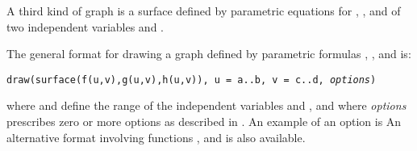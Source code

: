 
A third kind of \threedim{} graph is a surface defined by
parametric equations for , , and
 of two independent variables  and .

%
\beginImportant
The general format for drawing a \threedim{} graph defined by
parametric formulas , ,
and  is:
%
\begin{center}
{\tt draw(surface(f(u,v),g(u,v),h(u,v)), u = a..b, v = c..d, {\it options})}
\end{center}
where  and  define the range of the
independent variables  and , and where
{\it options} prescribes zero or more options as described in
.
An example of an option is 
An alternative format involving functions ,  and
 is also available.
\endImportant


